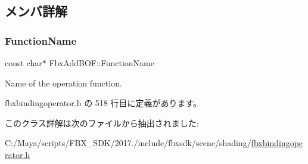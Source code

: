 \subsection{メンバ詳解}
\mbox{\label{class_fbx_add_b_o_f_a2929c676c1a89849156895fbe579fd4e}} 
\subsubsection{\texorpdfstring{Function\+Name}{FunctionName}}
{\footnotesize\ttfamily const char$\ast$ Fbx\+Add\+B\+O\+F\+::\+Function\+Name\hspace{0.3cm}{\ttfamily [static]}}



Name of the operation function. 



 fbxbindingoperator.\+h の 518 行目に定義があります。



このクラス詳解は次のファイルから抽出されました\+:\begin{DoxyCompactItemize}
\item 
C\+:/\+Maya/scripts/\+F\+B\+X\+\_\+\+S\+D\+K/2017./include/fbxsdk/scene/shading/\hyperlink{fbxbindingoperator_8h}{fbxbindingoperator.\+h}\end{DoxyCompactItemize}

